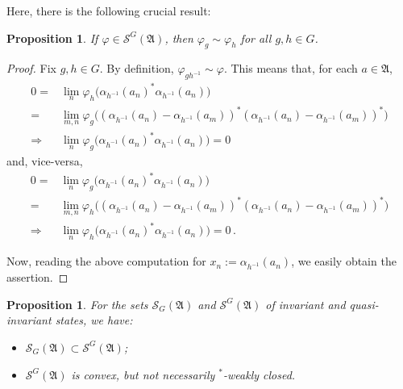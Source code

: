 \documentclass[12pt]{amsart}
\numberwithin{equation}{section}
\def\cs{{\mathcal S}}
\def\ga{{\mathfrak A}} \def\gpa{{\mathfrak a}}
\def\a{\alpha}
\def\f{\varphi}\def\ff{\phi} \def\F{\Phi}
\newtheorem{prop}[thm]{Proposition}
\begin{document}
Here, there is the following crucial result:
\begin{prop}
\label{ortiiq}
If $\f\in\cs^G(\ga)$, then 
$\f_g\sim\f_h$ for all $g,h\in G$.
\end{prop}
\begin{proof}
Fix $g,h\in G$. By definition, $\f_{gh^{-1}}\sim\f$. This means that, for each $a\in\ga$,
\begin{align*}
0=&\lim_n\f_h\big(\a_{h^{-1}}(a_n)^*\a_{h^{-1}}(a_n)\big)\\
=&\lim_{m,n}\f_g\big((\a_{h^{-1}}(a_n)-\a_{h^{-1}}(a_m))^*(\a_{h^{-1}}(a_n)-\a_{h^{-1}}(a_m))^*\big)\\
\Rightarrow&\lim_n\f_g\big(\a_{h^{-1}}(a_n)^*\a_{h^{-1}}(a_n)\big)=0
\end{align*}
and, vice-versa,
\begin{align*}
0=&\lim_n\f_g\big(\a_{h^{-1}}(a_n)^*\a_{h^{-1}}(a_n)\big)\\
=&\lim_{m,n}\f_h\big((\a_{h^{-1}}(a_n)-\a_{h^{-1}}(a_m))^*(\a_{h^{-1}}(a_n)-\a_{h^{-1}}(a_m))^*\big)\\
\Rightarrow&\lim_n\f_h\big(\a_{h^{-1}}(a_n)^*\a_{h^{-1}}(a_n)\big)=0\,.
\end{align*}

Now, reading the above computation for $x_n:=\a_{h^{-1}}(a_n)$, we easily obtain the assertion.
\end{proof}
\begin{prop}
\label{concon1}
For the sets $\cs_G(\ga)$ and $\cs^G(\ga)$ of invariant and quasi-invariant states, we have:
\begin{itemize} 
\item[(i)] $\cs_G(\ga)\subset\cs^G(\ga)$;
\item[(ii)] $\cs^G(\ga)$ is convex, but not necessarily ${}^*$-weakly closed.
\end{itemize} 
\end{prop}
\end{document}
